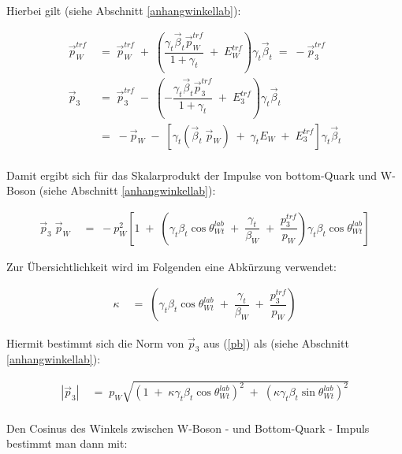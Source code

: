 \documentclass[
a4paper,                                %
twoside,                                %
BCOR1.4cm,                      %
ngerman,                                %
10pt,                           %
headings=normal,                %
headsepline,                    %
clearplainpage, %
final,                                  %
div=14,
parskip=full
]{scrbook}
\begin{document}
Hierbei gilt (siehe Abschnitt \ref{anhangwinkellab}):

\begin{align}
	\vec{p}_{W}^{trf}
\;&=\;
	\vec{p}_{W}^{trf}\;+\;
	\left(\dfrac{\gamma_{t} \vec{\beta}_{t} \vec{p}_{W}^{trf}}{1 + \gamma_{t}}
	\;+\;E_{W}^{trf} \right) \gamma_{t} \vec{\beta}_{t}	
\;=\;
	-\vec{p}_{3}^{trf}
\label{pWtrf}
\\
	\vec{p}_{3}
\;&=\;
	\vec{p}_{3}^{trf}\;-\;
	\left(-\dfrac{\gamma_{t} \vec{\beta}_{t} \vec{p}_{3}^{trf}}{1 + \gamma_{t}}
	\;+\;E_{3}^{trf} \right) \gamma_{t} \vec{\beta}_{t}
\nonumber
\\
\;&=\;
	-\vec{p}_{W}\;-\;\left[
		\gamma_{t} \left(\vec{\beta}_{t}\;\vec{p}_{W}\right)
		\;+\;\gamma_{t} E_{W}\;+\;E_{3}^{trf}
	\right]\gamma_{t} \vec{\beta}_{t}
\label{pb}
\\
\nonumber
\end{align}

Damit ergibt sich f\"ur das Skalarprodukt der Impulse von bottom-Quark und W-Boson (siehe Abschnitt \ref{anhangwinkellab}):

\begin{align}
	\vec{p}_{3}\;\vec{p}_{W}
\;&=\;
	-p_{W}^{2} \left[
		1\;+\;\left(\gamma_{t} \beta_{t} \cos \theta_{Wt}^{lab}
			\;+\;\dfrac{\gamma_{t}}{\beta_{W}}
			\;+\;\dfrac{p_{3}^{trf}}{p_{W}}
		\right) \gamma_{t} \beta_{t} \cos \theta_{Wt}^{lab}
	\right]
\label{skal_pbpW}
\end{align}

Zur \"Ubersichtlichkeit wird im Folgenden eine Abk\"urzung verwendet:

\begin{align}
	\kappa
\;&=\;
	\left(\gamma_{t} \beta_{t} \cos \theta_{Wt}^{lab}
		\;+\;\dfrac{\gamma_{t}}{\beta_{W}}
		\;+\;\dfrac{p_{3}^{trf}}{p_{W}}
	\right)
\end{align}

Hiermit bestimmt sich die Norm von $ \vec{p}_{3} $ aus (\ref{pb}) als (siehe Abschnitt \ref{anhangwinkellab}):

\begin{align}
	|\vec{p}_{3}|
\;&=\;
	p_{W} \sqrt{
		\left(1\;+\;\kappa \gamma_{t} \beta_{t} \cos \theta_{Wt}^{lab}\right)^{2}
		\;+\;\left(\kappa \gamma_{t} \beta_{t} \sin \theta_{Wt}^{lab}\right)^{2} 
	}
\\
\nonumber
\end{align}

Den Cosinus des Winkels zwischen W-Boson - und Bottom-Quark - Impuls bestimmt man dann mit:%
\end{document}
